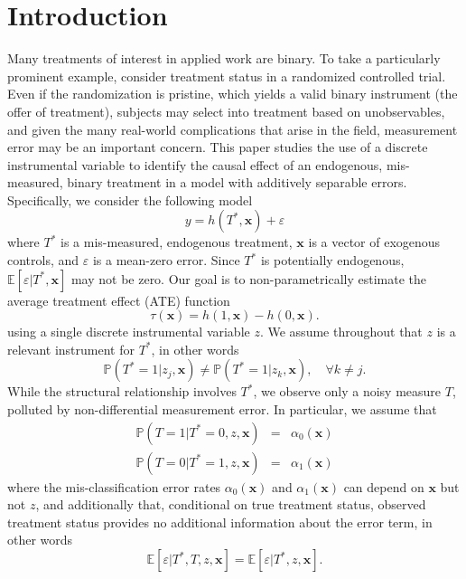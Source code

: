 \section{Introduction}
Many treatments of interest in applied work are binary.
To take a particularly prominent example, consider treatment status in a randomized controlled trial.
Even if the randomization is pristine, which yields a valid binary instrument (the offer of treatment), subjects may select into treatment based on unobservables, and given the many real-world complications that arise in the field, measurement error may be an important concern.
This paper studies the use of a discrete instrumental variable to identify the causal effect of an endogenous, mis-measured, binary treatment in a model with additively separable errors.
Specifically, we consider the following model 
\begin{equation}
  y = h(T^*, \mathbf{x}) + \varepsilon
  \label{eq:model}
\end{equation}
where $T^*$ is a mis-measured, endogenous treatment, $\mathbf{x}$ is a vector of exogenous controls, and $\varepsilon$ is a mean-zero error.
Since $T^*$ is potentially endogenous, $\mathbb{E}[\varepsilon|T^*,\mathbf{x}]$ may not be zero.
Our goal is to non-parametrically estimate the average treatment effect (ATE) function
\begin{equation}
  \tau(\mathbf{x}) = h(1,\mathbf{x}) - h(0,\mathbf{x}).
  \label{eq:ATE}
\end{equation}
using a single discrete instrumental variable $z$.
We assume throughout that $z$ is a relevant instrument for $T^*$, in other words 
\begin{equation}
\mathbb{P}(T^*=1|z_j,\mathbf{x})\neq \mathbb{P}(T^*=1|z_k,\mathbf{x}), \quad \forall k\neq j.
\end{equation}
While the structural relationship involves $T^*$, we observe only a noisy measure $T$, polluted by non-differential measurement error.
In particular, we assume that
\begin{eqnarray}
  \label{eq:a0}
  \mathbb{P}(T = 1| T^* = 0, z, \mathbf{x})  &=&  \alpha_0(\mathbf{x})\\
  \label{eq:a1}
  \mathbb{P}(T = 0| T^* = 1, z, \mathbf{x})  &=&  \alpha_1(\mathbf{x})
\end{eqnarray}
where the mis-classification error rates $\alpha_0(\mathbf{x})$ and $\alpha_1(\mathbf{x})$ can depend on $\mathbf{x}$ but not $z$, and additionally that, conditional on true treatment status, observed treatment status provides no additional information about the error term, in other words
\begin{equation}
  \mathbb{E}[\varepsilon|T^*,T,z,\mathbf{x}] =  \mathbb{E}[\varepsilon|T^*,z,\mathbf{x}].
  \label{eq:nondiff}
\end{equation}

